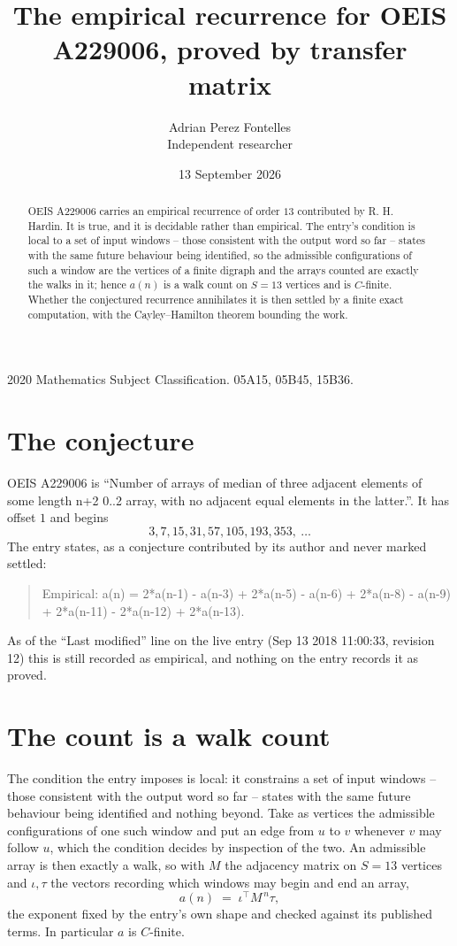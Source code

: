 \documentclass[11pt,a4paper]{article}
\title{The empirical recurrence for OEIS A229006, proved by transfer matrix}
\author{Adrian Perez Fontelles\\ \small Independent researcher}
\date{13 September 2026}
\theoremstyle{plain}
\theoremstyle{definition}
\begin{document}
\maketitle

\begin{abstract}
OEIS A229006 carries an empirical recurrence of order $13$ contributed by R. H. Hardin. It is
true, and it is decidable rather than empirical. The entry's condition is local to a set of input windows -- those consistent with the output word so far -- states with the same future behaviour being identified, so
the admissible configurations of such a window are the vertices of a finite digraph and the
arrays counted are exactly the walks in it; hence $a(n)$ is a walk count on $S=13$ vertices
and is $C$-finite. Whether the conjectured recurrence annihilates it is then settled by a
finite exact computation, with the Cayley--Hamilton theorem bounding the work.
\end{abstract}

\noindent\small 2020 Mathematics Subject Classification. 05A15, 05B45, 15B36.\normalsize

\section{The conjecture}

OEIS A229006 is ``Number of arrays of median of three adjacent elements of some length n+2 0..2 array, with no adjacent equal elements in the latter.''. It has offset $1$ and begins
\[
3, 7, 15, 31, 57, 105, 193, 353,\ \dots
\]
The entry states, as a conjecture contributed by its author and never marked settled:
\begin{quote}
Empirical: a(n) = 2*a(n-1) - a(n-3) + 2*a(n-5) - a(n-6) + 2*a(n-8) - a(n-9) + 2*a(n-11) - 2*a(n-12) + 2*a(n-13).
\end{quote}
As of the ``Last modified'' line on the live entry (Sep 13 2018 11:00:33, revision 12) this is still
recorded as empirical, and nothing on the entry records it as proved.

\section{The count is a walk count}

The condition the entry imposes is local: it constrains a set of input windows -- those consistent with the output word so far -- states with the same future behaviour being identified and nothing beyond. Take as
vertices the admissible configurations of one such window and put an edge from $u$ to $v$
whenever $v$ may follow $u$, which the condition decides by inspection of the two. An
admissible array is then exactly a walk, so with $M$ the adjacency matrix on $S=13$ vertices
and $\iota,\tau$ the vectors recording which windows may begin and end an array,
\[
a(n)\;=\;\iota^{\!\top}M^{\,n}\tau ,
\]
the exponent fixed by the entry's own shape and checked against its published terms. In
particular $a$ is $C$-finite.
\end{document}
